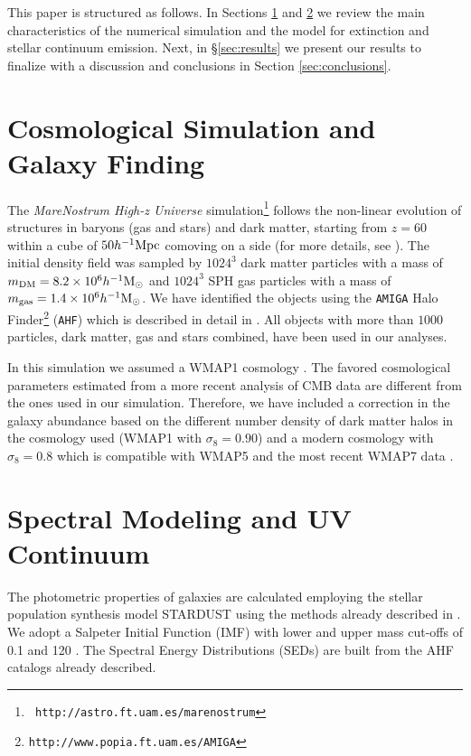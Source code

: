 \documentclass{emulateapj}
\newcommand{\hMpc}{{\ifmmode{h^{-1}{\rm Mpc}}\else{$h^{-1}$Mpc }\fi}}
\newcommand{\hMsun}{{\ifmmode{h^{-1}{\rm {M_{\odot}}}}\else{$h^{-1}{\rm{M_{\odot}}}$}\fi}}
\newcommand{\Msun}{{\ifmmode{{\rm {M_{\odot}}}}\else{${\rm{M_{\odot}}}$}\fi}}
\begin{document}
This paper is structured as follows. In Sections \ref{sec:galfinder}
and \ref{sec:spectra} we review the main characteristics of the
numerical simulation and the model for extinction and
stellar continuum emission. Next, in \S \ref{sec:results} we present our
results to finalize with a discussion and conclusions in Section
\ref{sec:conclusions}.  




\section{Cosmological Simulation and Galaxy Finding}
\label{sec:galfinder}

The {\em MareNostrum  High-z Universe} simulation{\footnote{\tt
   http://astro.ft.uam.es/marenostrum}} follows the non-linear evolution of
structures in   baryons (gas and stars) and dark matter, starting  from $z=
60$  within a cube of $50\hMpc$ comoving on a side (for more details, see \cite{2010MNRAS.403L..31F}). The initial density field was sampled by $1024^3$ dark matter particles with a mass of $m_{\rm DM} = 8.2 \times 10^6 \hMsun $ and $1024^3$ SPH gas particles with a mass of $m_{\rm gas} = 1.4 \times 10^6 \hMsun$.
We have identified  the objects  using the \texttt{AMIGA} Halo
Finder\footnote{{\tt http://www.popia.ft.uam.es/AMIGA}} (\texttt{AHF})  which
is described in detail in \citet{Knollmann2009}.  All objects with  more than  $1000$
particles,  dark matter, gas and stars combined, have been used  in our analyses.

In this simulation we assumed a WMAP1 cosmology \citep{2003ApJS..148..175S}.
The favored cosmological parameters estimated from a more recent analysis of  CMB data are different from the ones used in our simulation. Therefore, we have included a correction in  the galaxy abundance based on the different number
density of dark matter halos in the cosmology used  (WMAP1 with
$\sigma_8=0.90$)  and a modern cosmology with  $\sigma_8=0.8$  which is compatible with WMAP5 \citep{2009ApJS..180..306D} and the most recent  WMAP7 data  \citep{2011ApJS..192...16L}.


\section{Spectral Modeling and UV Continuum}
\label{sec:spectra}

 The photometric properties of galaxies are calculated employing the stellar
 population synthesis model STARDUST \citep{1999A&A...350..381D} using
 the methods already described in \cite{2010MNRAS.403L..31F}. We adopt a Salpeter Initial
 Function (IMF) with lower and upper mass cut-offs of 0.1 and 120 \Msun. The Spectral Energy Distributions (SEDs)  are built from the
 AHF catalogs already described.  
\end{document}
